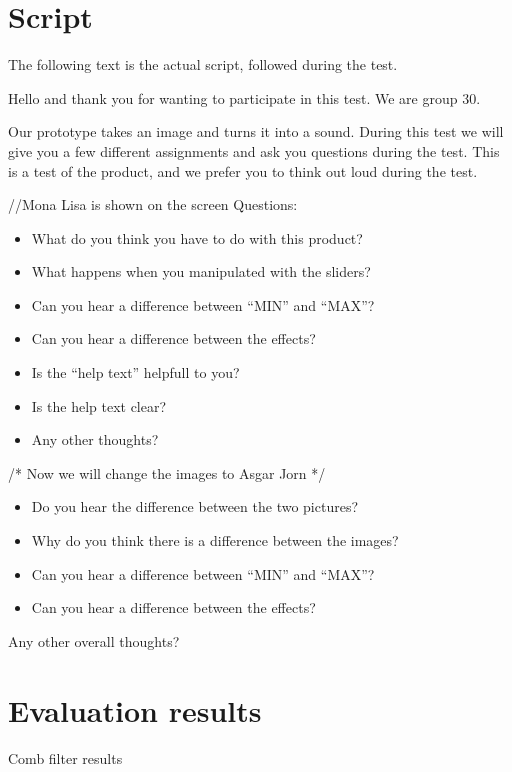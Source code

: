 \section{Script}
The following text is the actual script, followed during the test.

Hello and thank you for wanting to participate in this test. We are group 30.

Our prototype takes an image and turns it into a sound. During this test we will give you a few different assignments and ask you questions during the test. This is a test of the product, and we prefer you to think out loud during the test.

//Mona Lisa is shown on the screen 
Questions: 


\begin{itemize}
\item What do you think you have to do with this product?
\item What happens when you manipulated with the sliders?
\item Can you hear a difference between “MIN” and “MAX”?
\item Can you hear a difference between the effects?
\item Is the “help text” helpfull to you?
\item Is the help text clear?
\item Any other thoughts?
\end{itemize}



/* Now we will change the images to Asgar Jorn */
\begin{itemize}
\item Do you hear the difference between the two pictures?
\item Why do you think there is a difference between the images?
\item Can you hear a difference between “MIN” and “MAX”?
\item Can you hear a difference between the effects?
\end{itemize}


Any other overall thoughts?

\section{Evaluation results}
Comb filter results

